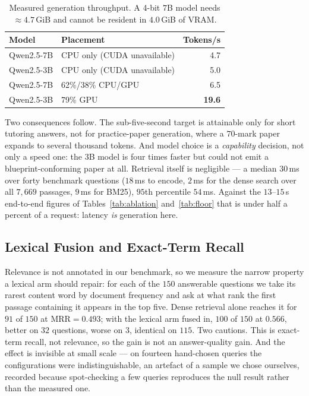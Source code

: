 \documentclass[conference]{IEEEtran}
\begin{document}
\begin{table}[htbp]
\caption{Measured generation throughput. A 4-bit $7$B model needs
$\approx 4.7$\,GiB and cannot be resident in $4.0$\,GiB of VRAM.}
\label{tab:throughput}
\centering
\footnotesize
\begin{tabular}{llr}
\toprule
\textbf{Model} & \textbf{Placement} & \textbf{Tokens/s} \\
\midrule
Qwen2.5-7B & CPU only (CUDA unavailable) & 4.7 \\
Qwen2.5-3B & CPU only (CUDA unavailable) & 5.0 \\
Qwen2.5-7B & 62\%/38\% CPU/GPU & 6.5 \\
Qwen2.5-3B & 79\% GPU & \textbf{19.6} \\
\bottomrule
\end{tabular}
\end{table}

Two consequences follow. The sub-five-second target is attainable only for short
tutoring answers, not for practice-paper generation, where a $70$-mark paper
expands to several thousand tokens. And model choice is a \emph{capability}
decision, not only a speed one: the $3$B model is four times faster but could
not emit a blueprint-conforming paper at all. Retrieval itself is negligible ---
a median $30$\,ms over forty benchmark questions ($18$\,ms to encode, $2$\,ms
for the dense search over all $7{,}669$ passages, $9$\,ms for BM25), $95$th
percentile $54$\,ms. Against the $13$--$15$\,s end-to-end figures of
Tables~\ref{tab:ablation} and~\ref{tab:floor} that is under half a percent of a
request: latency \emph{is} generation here.

\subsection{Lexical Fusion and Exact-Term Recall}
\label{sec:hybrideval}
Relevance is not annotated in our benchmark, so we measure the narrow property a
lexical arm should repair: for each of the $150$ answerable questions we take
its rarest content word by document frequency and ask at what rank the first
passage containing it appears in the top five. Dense retrieval alone reaches it
for $91$ of $150$ at $\mathrm{MRR} = 0.493$; with the lexical arm fused in,
$100$ of $150$ at $0.566$, better on $32$ questions, worse on $3$, identical on
$115$. Two cautions. This is exact-term recall, not relevance, so the gain is
not an answer-quality gain. And the effect is invisible at small scale --- on
fourteen hand-chosen queries the configurations were indistinguishable, an
artefact of a sample we chose ourselves, recorded because spot-checking a few
queries reproduces the null result rather than the measured one.
\end{document}
